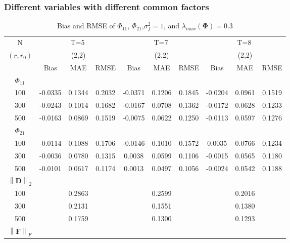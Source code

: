 \documentclass[12pt,a4paper,hyperref]{article}
\begin{document}
\subsubsection{Different variables with different common factors}
\begin{table}[H]
\caption{Bias and RMSE of $\Phi_{11}$, $\Phi_{21}$,$\sigma^{2}_{f}=1$,  and $\lambda_{max}(\boldsymbol{\Phi})=0.3$}
\centering
\tabcolsep=0.11cm
\begin{threeparttable}
\begin{tabular} {*{10}{c}}
\toprule
N& \multicolumn{3}{c}{T=5}&\multicolumn{3}{c}{T=7}&\multicolumn{3}{c}{T=8}\\
\cmidrule(lr){1-10}
$(r,r_{0})$ &   &(2,2)  &  &   &(2,2)  & &  &(2,2) & \\
\cmidrule(lr){1-4} \cmidrule(lr){5-7}\cmidrule(lr){8-10}
& \multicolumn{1}{c}{Bias} &\multicolumn{1}{c}{MAE}& \multicolumn{1}{c}{RMSE}&\multicolumn{1}{c}{Bias} &\multicolumn{1}{c}{MAE}& \multicolumn{1}{c}{RMSE}&\multicolumn{1}{c}{Bias}&\multicolumn{1}{c}{MAE} & \multicolumn{1}{c}{RMSE}\\
  \cmidrule(lr){2-4} \cmidrule(lr){5-7} \cmidrule(lr){8-10}
 $\Phi_{11}$\\
\cmidrule(lr){1-10}
 100&-0.0335 & 0.1344&0.2032 &-0.0371 &0.1206 & 0.1845&-0.0204 &0.0961 &0.1519\\
300& -0.0243&0.1014 &0.1682 & -0.0167& 0.0708& 0.1362&-0.0172&0.0628 &0.1233\\
500& -0.0163& 0.0869& 0.1519&  -0.0075& 0.0622& 0.1250&-0.0113 &0.0597 & 0.1276\\
\cmidrule(lr){1-10}
$\Phi_{21}$\\
\cmidrule(lr){1-4}   \cmidrule(lr){5-7}   \cmidrule(lr){8-10}
100& -0.0114& 0.1088& 0.1706& -0.0146 &0.1010& 0.1572& 0.0035& 0.0766&0.1234 \\
300& -0.0036& 0.0780&0.1315& 0.0038& 0.0599&0.1106 &-0.0015 & 0.0565&0.1180\\
500& -0.0101& 0.0617& 0.1174& 0.0013 &0.0497 & 0.1056& -0.0024&0.0542 & 0.1188\\
\cmidrule(lr){1-10}
$\left\| \boldsymbol{D} \right\|_{2} $\\
\cmidrule(lr){1-4}   \cmidrule(lr){5-7}   \cmidrule(lr){8-10}
100& &0.2863& &  & 0.2599& & &0.2016 & \\
300& & 0.2131& &  &0.1551& & &0.1380 &\\
500& & 0.1759& &  & 0.1300& & & 0.1293& \\
\cmidrule(lr){1-10}
$\left\| \boldsymbol{F} \right\|_{F} $\\

\end{tabular}
\end{threeparttable}
\end{table}
\end{document}
